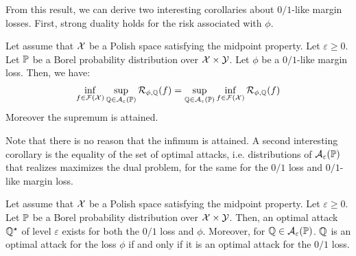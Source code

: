 From this result, we can derive two interesting corollaries about  $0/1$-like margin losses. First, strong duality holds for the risk associated with ${\phi}$.

\begin{coro} 
\label{coro:nash}
Let assume that $\mathcal{X}$ be a Polish space satisfying the midpoint property. Let $\varepsilon\geq 0$. Let $\mathbb{P}$ be a Borel probability distribution over $\mathcal{X}\times\mathcal{Y}$. Let ${\phi}$ be a $0/1$-like margin loss. Then, we have:
\begin{align*}
\inf_{f\in\mathcal{F}(\mathcal{X})}\sup_{\mathbb{Q}\in\mathcal{A}_\varepsilon(\mathbb{P})} \mathcal{R}_{\phi,\mathbb{Q}}(f) =    \sup_{\mathbb{Q}\in\mathcal{A}_\varepsilon(\mathbb{P})} \inf_{f\in\mathcal{F}(\mathcal{X})} \mathcal{R}_{\phi,\mathbb{Q}}(f)
\end{align*}
Moreover the supremum is attained.
\end{coro}

Note that there is no reason that the infimum is attained. A second interesting corollary is the equality of the set of optimal attacks, i.e. distributions of $\mathcal{A}_\varepsilon(\mathbb{P})$ that realizes maximizes the dual problem, for the same for the $0/1$ loss and $0/1$-like margin loss.


\begin{coro}
\label{coro:optattacks}
Let assume that $\mathcal{X}$ be a Polish space satisfying the midpoint property. Let $\varepsilon\geq 0$. Let $\mathbb{P}$ be a Borel probability distribution over $\mathcal{X}\times\mathcal{Y}$. Then, an optimal attack $\mathbb{Q}^\star$  of level $\varepsilon$  exists for both the $0/1$ loss and  $\phi$. Moreover, for $\mathbb{Q}\in\mathcal{A}_\varepsilon(\mathbb{P})$.  $\mathbb{Q}$ is an optimal attack for the loss $\phi$  if and only if it is an optimal attack for the $0/1$ loss.
\end{coro}


